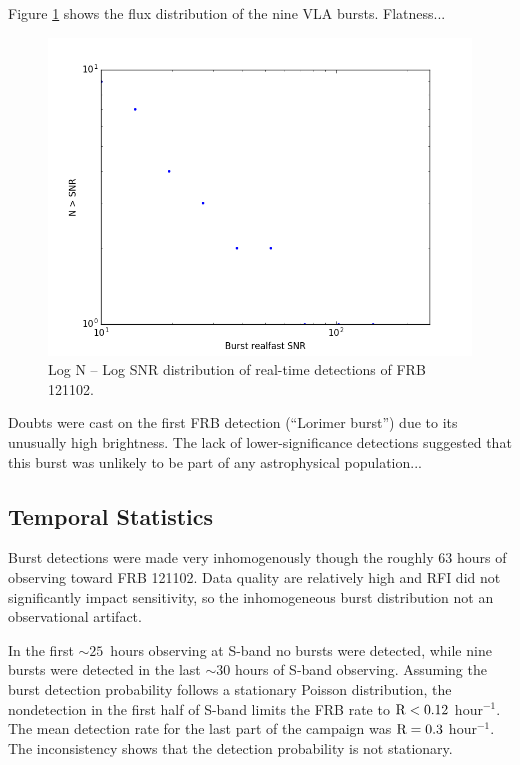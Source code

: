 \documentclass{emulateapj}
\begin{document}
Figure \ref{fig:logns} shows the flux distribution of the nine VLA bursts. Flatness...

\begin{figure}[htb]
\begin{center}
\includegraphics[width=0.9\columnwidth]{logns}
\caption{Log N -- Log SNR distribution of real-time detections of FRB 121102.
\label{fig:logns}}
\end{center}
\end{figure}

Doubts were cast on the first FRB detection (``Lorimer burst'') due to its unusually high brightness. The lack of lower-significance detections suggested that this burst was unlikely to be part of any astrophysical population...

\subsection{Temporal Statistics}

Burst detections were made very inhomogenously though the roughly 63 hours of observing toward FRB 121102. Data quality are relatively high and RFI did not significantly impact sensitivity, so the inhomogeneous burst distribution not an observational artifact.

In the first $\sim25$\ hours observing at S-band no bursts were detected, while nine bursts were detected in the last $\sim30$ hours of S-band observing. Assuming the burst detection probability follows a stationary Poisson distribution, the nondetection in the first half of S-band limits the FRB rate to $\rm{R}<0.12$ hour$^{-1}$. The mean detection rate for the last part of the campaign was $\rm{R}=0.3$ hour$^{-1}$. The inconsistency shows that the detection probability is not stationary.
\end{document}
